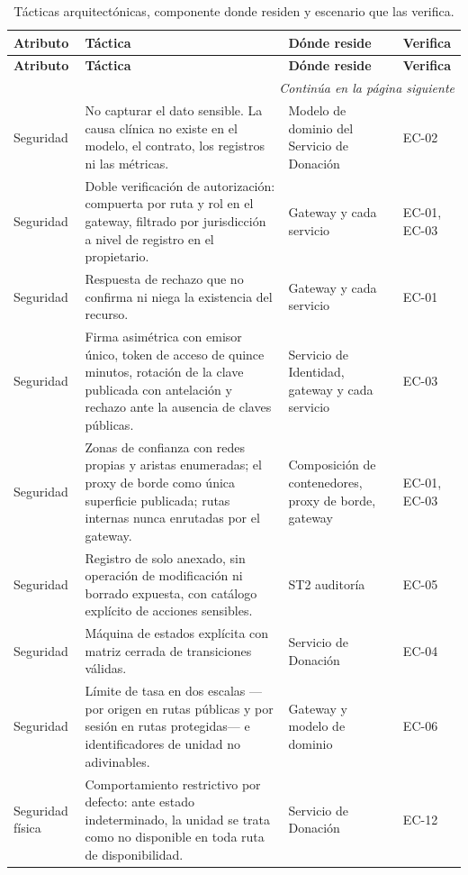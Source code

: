 \documentclass[11pt,a4paper]{article}
\newcommand{\contlinea}[1]{\multicolumn{#1}{r}{\footnotesize\itshape Continúa en la página siguiente}}
\begin{document}
\begin{longtable}{L{2.4cm} L{5.6cm} L{3.4cm} L{2.4cm}}
\caption{Tácticas arquitectónicas, componente donde residen y escenario que las verifica.}\label{tab:tacticas}\\
\toprule
\textbf{Atributo} & \textbf{Táctica} & \textbf{Dónde reside} & \textbf{Verifica} \\
\midrule
\endfirsthead
\toprule
\textbf{Atributo} & \textbf{Táctica} & \textbf{Dónde reside} & \textbf{Verifica} \\
\midrule
\endhead
\midrule
\contlinea{4} \\
\endfoot
\bottomrule
\endlastfoot
Seguridad & No capturar el dato sensible. La causa clínica no existe en el modelo, el contrato, los registros ni las métricas. & Modelo de dominio del Servicio de Donación & EC-02 \\
Seguridad & Doble verificación de autorización: compuerta por ruta y rol en el gateway, filtrado por jurisdicción a nivel de registro en el propietario. & Gateway y cada servicio & EC-01, EC-03 \\
Seguridad & Respuesta de rechazo que no confirma ni niega la existencia del recurso. & Gateway y cada servicio & EC-01 \\
Seguridad & Firma asimétrica con emisor único, token de acceso de quince minutos, rotación de la clave publicada con antelación y rechazo ante la ausencia de claves públicas. & Servicio de Identidad, gateway y cada servicio & EC-03 \\
Seguridad & Zonas de confianza con redes propias y aristas enumeradas; el proxy de borde como única superficie publicada; rutas internas nunca enrutadas por el gateway. & Composición de contenedores, proxy de borde, gateway & EC-01, EC-03 \\
Seguridad & Registro de solo anexado, sin operación de modificación ni borrado expuesta, con catálogo explícito de acciones sensibles. & ST2 auditoría & EC-05 \\
Seguridad & Máquina de estados explícita con matriz cerrada de transiciones válidas. & Servicio de Donación & EC-04 \\
Seguridad & Límite de tasa en dos escalas ---por origen en rutas públicas y por sesión en rutas protegidas--- e identificadores de unidad no adivinables. & Gateway y modelo de dominio & EC-06 \\
Seguridad física & Comportamiento restrictivo por defecto: ante estado indeterminado, la unidad se trata como no disponible en toda ruta de disponibilidad. & Servicio de Donación & EC-12 \\

\end{longtable}
\end{document}

